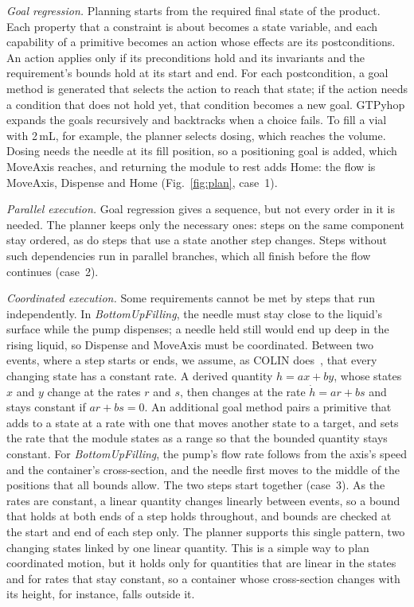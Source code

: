 \documentclass[5p,times,procedia]{elsarticle}
\begin{document}
\emph{Goal regression.} Planning starts from the required final state of the product. Each property that a constraint is about becomes a state variable, and each capability of a primitive becomes an action whose effects are its postconditions. An action applies only if its preconditions hold and its invariants and the requirement's bounds hold at its start and end. For each postcondition, a goal method is generated that selects the action to reach that state; if the action needs a condition that does not hold yet, that condition becomes a new goal. GTPyhop expands the goals recursively and backtracks when a choice fails. To fill a vial with 2\,mL, for example, the planner selects dosing, which reaches the volume. Dosing needs the needle at its fill position, so a positioning goal is added, which MoveAxis reaches, and returning the module to rest adds Home: the flow is MoveAxis, Dispense and Home (Fig.~\ref{fig:plan}, case~1).

\emph{Parallel execution.} Goal regression gives a sequence, but not every order in it is needed. The planner keeps only the necessary ones: steps on the same component stay ordered, as do steps that use a state another step changes. Steps without such dependencies run in parallel branches, which all finish before the flow continues (case~2).

\emph{Coordinated execution.} Some requirements cannot be met by steps that run independently. In \textit{BottomUpFilling}, the needle must stay close to the liquid's surface while the pump dispenses; a needle held still would end up deep in the rising liquid, so Dispense and MoveAxis must be coordinated. Between two events, where a step starts or ends, we assume, as COLIN does~\cite{coles2012colin}, that every changing state has a constant rate. A derived quantity $h = a x + b y$, whose states $x$ and $y$ change at the rates $r$ and $s$, then changes at the rate $\dot{h} = a r + b s$ and stays constant if $a r + b s = 0$. An additional goal method pairs a primitive that adds to a state at a rate with one that moves another state to a target, and sets the rate that the module states as a range so that the bounded quantity stays constant. For \textit{BottomUpFilling}, the pump's flow rate follows from the axis's speed and the container's cross-section, and the needle first moves to the middle of the positions that all bounds allow. The two steps start together (case~3). As the rates are constant, a linear quantity changes linearly between events, so a bound that holds at both ends of a step holds throughout, and bounds are checked at the start and end of each step only. The planner supports this single pattern, two changing states linked by one linear quantity. This is a simple way to plan coordinated motion, but it holds only for quantities that are linear in the states and for rates that stay constant, so a container whose cross-section changes with its height, for instance, falls outside it.
\end{document}
